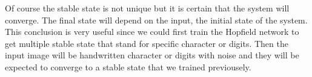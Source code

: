 Of course the stable state is not unique but it is certain that the system will converge. The final state will depend on the input, the initial state of the system. This conclusion is very useful since we could first train the Hopfield network to get multiple stable state that stand for specific character or digits. Then the input image will be handwritten character or digits with noise and they will be expected to converge to a stable state that we trained previousely. 

